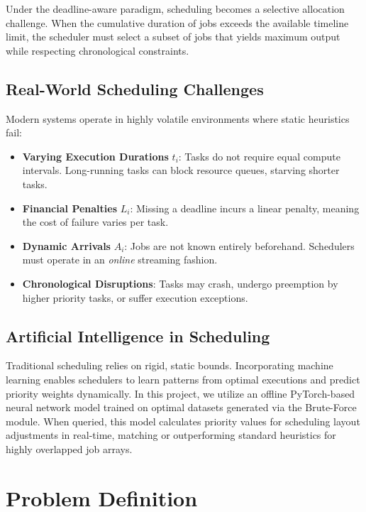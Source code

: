 \documentclass[12pt,a4paper]{article}
\begin{document}
Under the deadline-aware paradigm, scheduling becomes a selective allocation challenge. When the cumulative duration of jobs exceeds the available timeline limit, the scheduler must select a subset of jobs that yields maximum output while respecting chronological constraints. 

\subsection{Real-World Scheduling Challenges}
Modern systems operate in highly volatile environments where static heuristics fail:
\begin{itemize}
    \item \textbf{Varying Execution Durations} $t_i$: Tasks do not require equal compute intervals. Long-running tasks can block resource queues, starving shorter tasks.
    \item \textbf{Financial Penalties} $L_i$: Missing a deadline incurs a linear penalty, meaning the cost of failure varies per task.
    \item \textbf{Dynamic Arrivals} $A_i$: Jobs are not known entirely beforehand. Schedulers must operate in an \textit{online} streaming fashion.
    \item \textbf{Chronological Disruptions}: Tasks may crash, undergo preemption by higher priority tasks, or suffer execution exceptions.
\end{itemize}

\subsection{Artificial Intelligence in Scheduling}
Traditional scheduling relies on rigid, static bounds. Incorporating machine learning enables schedulers to learn patterns from optimal executions and predict priority weights dynamically. In this project, we utilize an offline PyTorch-based neural network model trained on optimal datasets generated via the Brute-Force module. When queried, this model calculates priority values for scheduling layout adjustments in real-time, matching or outperforming standard heuristics for highly overlapped job arrays.


\section{Problem Definition}
\end{document}
